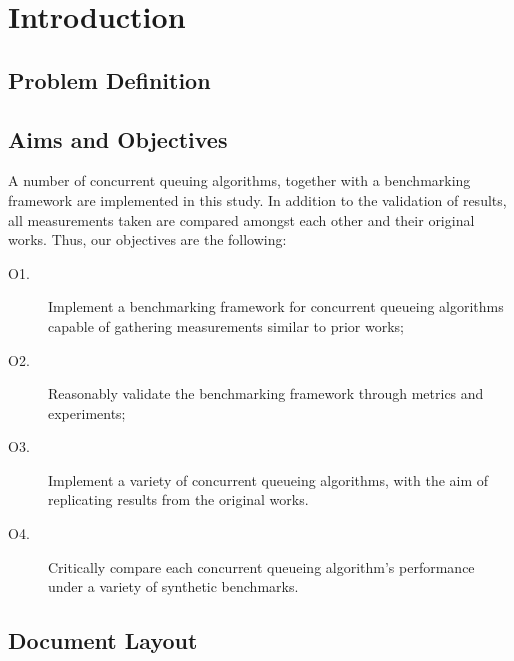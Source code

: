 \chapter{Introduction}
\section{Problem Definition}
\section{Aims and Objectives}

A number of concurrent queuing algorithms, together with a benchmarking
framework are implemented in this study. In addition to the validation of results, all
measurements taken are compared amongst each other and their original works.
Thus, our objectives are the following:

\begin{description}
\item[O1.] Implement a benchmarking framework for concurrent queueing
algorithms capable of gathering measurements similar to prior works;
\item[O2.] Reasonably validate the benchmarking framework through
metrics and experiments;
\item[O3.] Implement a variety of concurrent queueing algorithms, with the aim
of replicating results from the original works.
\item[O4.] Critically compare each concurrent queueing algorithm's performance
under a variety of synthetic benchmarks.
\end{description}

\section{Document Layout}
